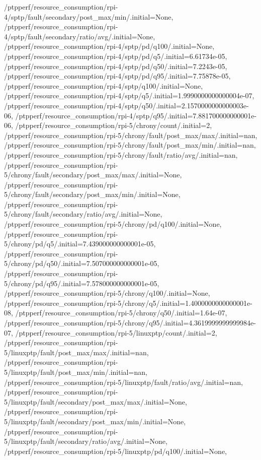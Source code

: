 {    /ptpperf/resource_consumption/rpi-4/sptp/fault/secondary/post_max/min/.initial=None,
    /ptpperf/resource_consumption/rpi-4/sptp/fault/secondary/ratio/avg/.initial=None,
    /ptpperf/resource_consumption/rpi-4/sptp/pd/q100/.initial=None,
    /ptpperf/resource_consumption/rpi-4/sptp/pd/q5/.initial=6.61734e-05,
    /ptpperf/resource_consumption/rpi-4/sptp/pd/q50/.initial=7.2243e-05,
    /ptpperf/resource_consumption/rpi-4/sptp/pd/q95/.initial=7.75878e-05,
    /ptpperf/resource_consumption/rpi-4/sptp/q100/.initial=None,
    /ptpperf/resource_consumption/rpi-4/sptp/q5/.initial=1.9990000000000004e-07,
    /ptpperf/resource_consumption/rpi-4/sptp/q50/.initial=2.1570000000000003e-06,
    /ptpperf/resource_consumption/rpi-4/sptp/q95/.initial=7.881700000000001e-06,
    /ptpperf/resource_consumption/rpi-5/chrony/count/.initial=2,
    /ptpperf/resource_consumption/rpi-5/chrony/fault/post_max/max/.initial=nan,
    /ptpperf/resource_consumption/rpi-5/chrony/fault/post_max/min/.initial=nan,
    /ptpperf/resource_consumption/rpi-5/chrony/fault/ratio/avg/.initial=nan,
    /ptpperf/resource_consumption/rpi-5/chrony/fault/secondary/post_max/max/.initial=None,
    /ptpperf/resource_consumption/rpi-5/chrony/fault/secondary/post_max/min/.initial=None,
    /ptpperf/resource_consumption/rpi-5/chrony/fault/secondary/ratio/avg/.initial=None,
    /ptpperf/resource_consumption/rpi-5/chrony/pd/q100/.initial=None,
    /ptpperf/resource_consumption/rpi-5/chrony/pd/q5/.initial=7.439000000000001e-05,
    /ptpperf/resource_consumption/rpi-5/chrony/pd/q50/.initial=7.507000000000001e-05,
    /ptpperf/resource_consumption/rpi-5/chrony/pd/q95/.initial=7.578000000000001e-05,
    /ptpperf/resource_consumption/rpi-5/chrony/q100/.initial=None,
    /ptpperf/resource_consumption/rpi-5/chrony/q5/.initial=1.4000000000000001e-08,
    /ptpperf/resource_consumption/rpi-5/chrony/q50/.initial=1.64e-07,
    /ptpperf/resource_consumption/rpi-5/chrony/q95/.initial=4.3619999999999984e-07,
    /ptpperf/resource_consumption/rpi-5/linuxptp/count/.initial=2,
    /ptpperf/resource_consumption/rpi-5/linuxptp/fault/post_max/max/.initial=nan,
    /ptpperf/resource_consumption/rpi-5/linuxptp/fault/post_max/min/.initial=nan,
    /ptpperf/resource_consumption/rpi-5/linuxptp/fault/ratio/avg/.initial=nan,
    /ptpperf/resource_consumption/rpi-5/linuxptp/fault/secondary/post_max/max/.initial=None,
    /ptpperf/resource_consumption/rpi-5/linuxptp/fault/secondary/post_max/min/.initial=None,
    /ptpperf/resource_consumption/rpi-5/linuxptp/fault/secondary/ratio/avg/.initial=None,
    /ptpperf/resource_consumption/rpi-5/linuxptp/pd/q100/.initial=None,
}

